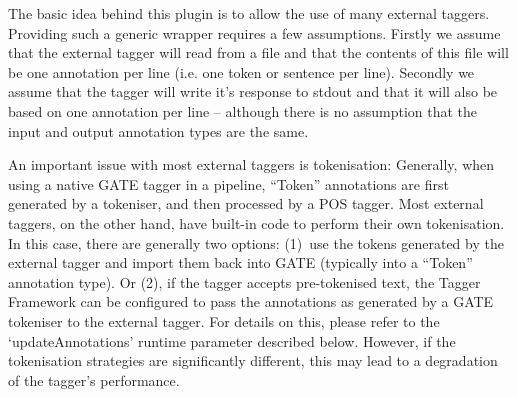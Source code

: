 The basic idea behind this plugin is to allow the use of many external taggers. Providing such a generic
wrapper requires a few assumptions. Firstly we assume that the external tagger will read from a file and
that the contents of this file will be one annotation per line (i.e. one token or sentence per line). Secondly
we assume that the tagger will write it's response to stdout and that it will also be based on one
annotation per line -- although there is no assumption that the input and output annotation types are the same.

An important issue with most external taggers is tokenisation:
Generally, when using a native GATE tagger in a pipeline, ``Token''
annotations are first generated by a tokeniser, and then processed by
a POS tagger. Most external taggers, on the other hand, have built-in
code to perform their own tokenisation. In this case, there are
generally two options: (1)~use the tokens generated by the external
tagger and import them back into GATE (typically into a ``Token''
annotation type). Or (2), if the tagger accepts pre-tokenised text,
the Tagger Framework can be configured to pass the annotations as
generated by a GATE tokeniser to the external tagger. For details on
this, please refer to the `updateAnnotations' runtime parameter
described below. However, if the tokenisation strategies are
significantly different, this may lead to a degradation of the
tagger's performance.

